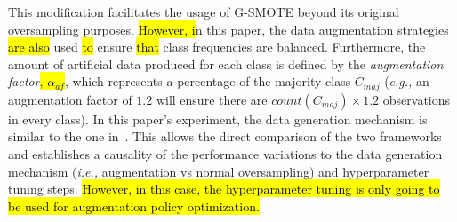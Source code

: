 \documentclass[preprint, 12pt]{elsarticle}
\begin{document}
This modification facilitates the usage of G-SMOTE beyond its original
oversampling purposes. \hl{However, i}n this paper, the data augmentation
strategies \hl{are also }used \hl{to} ensure \hl{that} class frequencies are
balanced. Furthermore, the amount of artificial data produced for each class
is defined by the \textit{augmentation factor}\hl{, $\alpha_{af}$}, which
represents a percentage of the majority class $C_{maj}$ (\textit{e.g.,} an
augmentation factor of $1.2$ will ensure there are $count(C_{maj}) \times 1.2$
observations in every class). In this paper's experiment, the data generation
mechanism is similar to the one in~\cite{Fonseca2021}. This allows the direct
comparison of the two frameworks and establishes a causality of the
performance variations to the data generation mechanism (\textit{i.e.,}
augmentation vs normal oversampling) and hyperparameter tuning steps.
\hl{However, in this case, the hyperparameter tuning is only going to be used
for augmentation policy optimization.} 
\end{document}
